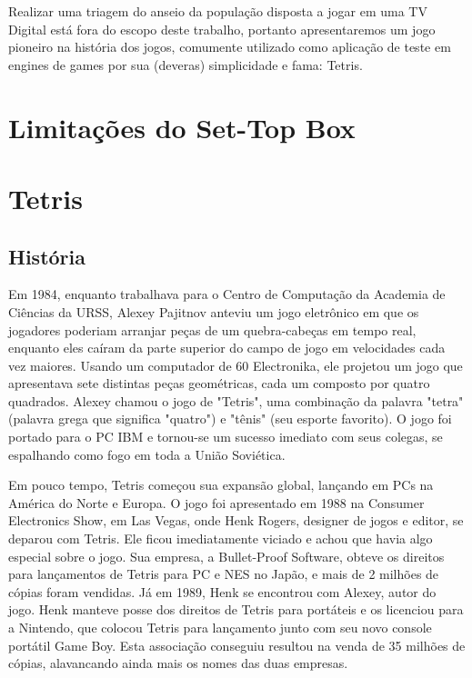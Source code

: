 \documentclass[
	12pt,				%
	openright,			%
	oneside,			%
	a4paper,			%
	brazil,				%
	]{abntex2}
\begin{document}
Realizar uma triagem do anseio da população disposta a jogar em uma TV Digital está fora do escopo deste trabalho, portanto apresentaremos um jogo pioneiro na história dos jogos, comumente utilizado como aplicação de teste em engines de games por sua (deveras) simplicidade e fama: Tetris.

\section{Limitações do Set-Top Box}



\section{Tetris}

\subsection{História}

Em 1984, enquanto trabalhava para o Centro de Computação da Academia de Ciências da URSS, Alexey Pajitnov anteviu um jogo eletrônico em que os jogadores poderiam arranjar peças de um quebra-cabeças em tempo real, enquanto eles caíram da parte superior do campo de jogo em velocidades cada vez maiores. Usando um computador de 60 Electronika, ele projetou um jogo que apresentava sete distintas peças geométricas, cada um composto por quatro quadrados. Alexey chamou o jogo de "Tetris", uma combinação da palavra "tetra" (palavra grega que significa "quatro") e "tênis" (seu esporte favorito). O jogo foi portado para o PC IBM e tornou-se um sucesso imediato com seus colegas, se espalhando como fogo em toda a União Soviética.

Em pouco tempo, Tetris começou sua expansão global, lançando em PCs na América do Norte e Europa. O jogo foi apresentado em 1988 na Consumer Electronics Show, em Las Vegas, onde Henk Rogers, designer de jogos e editor, se deparou com Tetris. Ele ficou imediatamente viciado e achou que havia algo especial sobre o jogo. Sua empresa, a Bullet-Proof Software, obteve os direitos para lançamentos de Tetris para PC e NES no Japão, e mais de 2 milhões de cópias foram vendidas. Já em 1989, Henk se encontrou com Alexey, autor do jogo. Henk manteve posse dos direitos de Tetris para portáteis e os licenciou para a Nintendo, que colocou Tetris para lançamento junto com seu novo console portátil Game Boy. Esta associação conseguiu resultou na venda de 35 milhões de cópias, alavancando ainda mais os nomes das duas empresas.
\end{document}

